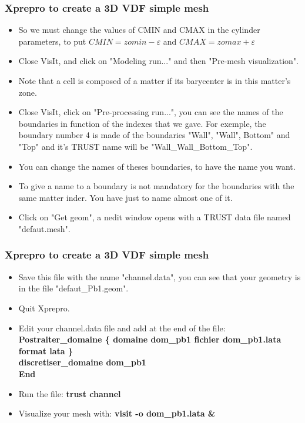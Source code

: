 \documentclass[10pt, hyperref={unicode=true,pdfusetitle, bookmarks=true,bookmarksnumbered=false,bookmarksopen=false, breaklinks=false,pdfborder={0 0 1},backref=true,colorlinks=true,linkcolor=darkblue,pageanchor}]{beamer}
\begin{document}
\begin{frame}
\frametitle{Xprepro to create a 3D VDF simple mesh}
\begin{block}{}

\begin{itemize}
\item So we must change the values of CMIN and CMAX in the cylinder parameters, to put $CMIN=zomin-\varepsilon$ and $CMAX=zomax+\varepsilon$
\item Close VisIt, and click on "Modeling run..." and then "Pre-mesh visualization".
\item Note that a cell is composed of a matter if its barycenter is in this matter's zone.
\item Close VisIt, click on "Pre-processing run...", you can see the names of the boundaries in function of the indexes that we gave. For exemple, the boundary number 4 is made of the boundaries "Wall", "Wall", Bottom" and "Top" and it's TRUST name will be "Wall\_Wall\_Bottom\_Top".
\item You can change the names of theses boundaries, to have the name you want.
\item To give a name to a boundary is not mandatory for the boundaries with the same matter inder. You have just to name almost one of it.
\item Click on "Get geom", a nedit window opens with a TRUST data file named "defaut.mesh".
\end{itemize}

\end{block}
\end{frame}
\begin{frame}
\frametitle{Xprepro to create a 3D VDF simple mesh}
\begin{block}{}

\begin{itemize}
\item Save this file with the name "channel.data", you can see that your geometry is in the file "defaut\_Pb1.geom".
\item Quit Xprepro.
\item Edit your channel.data file and add at the end of the file: \\
{\small{
\textbf{Postraiter\_domaine \{ domaine dom\_pb1 fichier dom\_pb1.lata format lata \} \\
discretiser\_domaine dom\_pb1 \\
End }
}}
\item Run the file: \textbf{trust channel}
\item Visualize your mesh with: \textbf{visit -o dom\_pb1.lata \& }
\end{itemize}

\end{block}
\end{frame}
\end{document}
